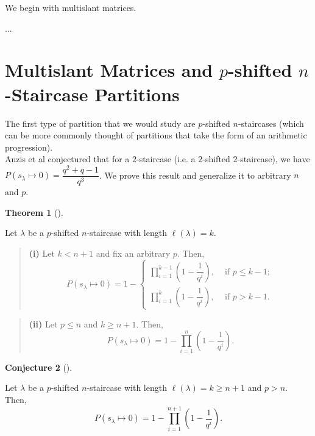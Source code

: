 \documentclass[numbers=enddot,12pt,final,onecolumn,notitlepage]{scrartcl}%
\theoremstyle{definition}
\newtheorem{theo}{Theorem}[section]
\newenvironment{theorem}[1][]
{\begin{theo}[#1]\begin{leftbar}}
{\end{leftbar}\end{theo}}
\newtheorem{defi}[theo]{Definition}
\newenvironment{definition}[1][]
{\begin{defi}[#1]\begin{leftbar}}
{\end{leftbar}\end{defi}}
\newtheorem{conj}[theo]{Conjecture}
\newenvironment{conjecture}[1][]
{\begin{conj}[#1]\begin{leftbar}}
{\end{leftbar}\end{conj}}
\newenvironment{statement}{\begin{quote}}{\end{quote}}
\let\prodnonlimits\prod
\renewcommand{\prod}{\prodnonlimits\limits}
\newcommand{\NN}{\mathbb{N}}
\renewcommand{\leq}{\leqslant}
\renewcommand{\geq}{\geqslant}
\theoremstyle{plainsl}
\begin{document}
We begin with multislant matrices.

...



\section{Multislant Matrices and $p$-shifted $n$-Staircase Partitions}
The first type of partition that we would study are $p$-shifted $n$-staircases (which can be more commonly thought of partitions that take the form of an arithmetic progression). \\


Anzis et al \cite{Anzis18} conjectured that for a $2$-staircase (i.e. a $2$-shifted $2$-staircase), we have $P(s_{\lambda} \longmapsto 0) = \dfrac{q^2+q -1}{q^3}$. We prove this result and generalize it to arbitrary $n$ and $p$.

\begin{theorem}
\label{thm.n.staircase}

Let $\lambda$ be a $p$-shifted $n$-staircase with
length $\ell(\lambda) = k$.

\begin{statement}
\textbf{(i)} Let $k < n+1$ and fix an arbitrary $p$. Then,
\[
P(s_{\lambda} \longmapsto 0) =
1 -
\begin{cases}
\prod_{i=1}^{k-1} \left(  1-\dfrac{1}{q^{i}}\right) ,
& \text{ if } p \leq k-1; \\
\prod_{i=1}^{k} \left(  1-\dfrac{1}{q^{i}}\right) ,
& \text{ if } p > k-1.
\end{cases}
\]
\end{statement}
 
\begin{statement}
\textbf{(ii)} Let $p \leq n$ and $k \geq n+1$. Then, 
\[
P(s_{\lambda} \longmapsto 0) = 1- \prod_{i=1}^{n} \left(  1-\dfrac{1}{q^{i}}\right) .
\]
\end{statement}
\end{theorem}
\begin{conjecture}
\label{bigoutwardstaircases}
Let $\lambda$ be a $p$-shifted $n$-staircase with length $\ell(\lambda) = k \geq n+1$ and $p > n$.  Then,
\[
P(s_{\lambda} \longmapsto 0) = 1-\prod_{i=1}^{n+1} \left(  1-\dfrac{1}{q^{i}}\right).
\]
\end{conjecture}
\end{document}
